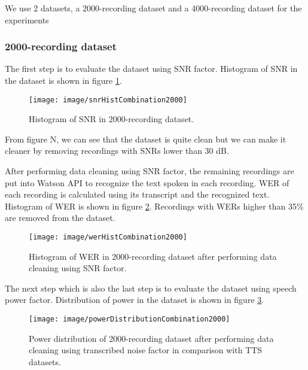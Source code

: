 \documentclass[12pt]{article}
\begin{document}
We use 2 datasets, a 2000-recording dataset and a 4000-recording dataset for the experiments

\subsubsection{2000-recording dataset}
The first step is to evaluate the dataset using SNR factor. Histogram of SNR in the dataset is shown in figure \ref{fig_snrHistCombination2000}.

\begin{figure}[t]
\begin{center}
\texttt{[image: image/snrHistCombination2000]}
\end{center}
\vspace{-0.3cm}
\caption[SNR hist combination 2000.]{Histogram of SNR in 2000-recording dataset.}
\label{fig_snrHistCombination2000}
\end{figure}

From figure N, we can see that the dataset is quite clean but we can make it cleaner by removing recordings with SNRs lower than 30 dB.

After performing data cleaning using SNR factor, the remaining recordings are put into Watson API to recognize the text spoken in each recording. WER of each recording is calculated using its transcript and the recognized text. Histogram of WER is shown in figure \ref{fig_werHistCombination2000}. Recordings with WERs higher than 35\% are removed from the dataset.

\begin{figure}[t]
\begin{center}
\texttt{[image: image/werHistCombination2000]}
\end{center}
\vspace{-0.3cm}
\caption[WER hist combination 2000.]{Histogram of WER in 2000-recording dataset after performing data cleaning using SNR factor.}
\label{fig_werHistCombination2000}
\end{figure}

The next step which is also the last step is to evaluate the dataset using speech power factor. Distribution of power in the dataset is shown in figure \ref{fig_powerDistributionCombination2000}.

\begin{figure}[t]
\begin{center}
\texttt{[image: image/powerDistributionCombination2000]}
\end{center}
\vspace{-0.3cm}
\caption[power distribution combination 2000.]{Power distribution of 2000-recording dataset after performing data cleaning using transcribed noise factor in comparison with TTS datasets.}
\label{fig_powerDistributionCombination2000}
\end{figure}
\end{document}
